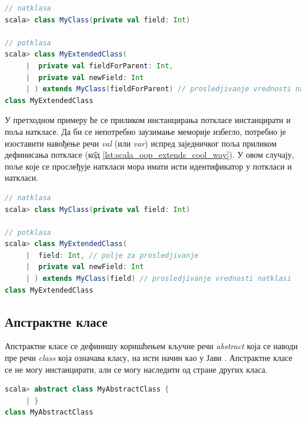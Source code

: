 \documentclass[12pt,oneside]{memoir}
\begin{document}
\begin{lstlisting}[language=Scala, caption={Наслеђивање у Скали}, label={lst:scala_oop_extends_example}, basicstyle=\small]
// natklasa
scala> class MyClass(private val field: Int) 

// potklasa
scala> class MyExtendedClass(
     |  private val fieldForParent: Int,
     |  private val newField: Int
     | ) extends MyClass(fieldForParent) // prosledjivanje vrednosti natklasi
class MyExtendedClass

\end{lstlisting}

У претходном примеру ће се приликом инстанцирања поткласе инстанцирати и поља наткласе. Да би се непотребно заузимање меморије избегло, потребно је изоставити навођење речи \textit{val} (или \textit{var}) испред заједничког поља приликом дефинисања поткласе (к\^{о}д \ref{lst:scala_oop_extends_cool_way}). У овом случају, поље које се прослеђује наткласи мора имати исти идентификатор у поткласи и наткласи.

\begin{lstlisting}[language=Scala, caption={Наслеђивање изастављењем речи \textit{val}}, label={lst:scala_oop_extends_cool_way}, basicstyle=\small]
// natklasa
scala> class MyClass(private val field: Int) 

// potklasa
scala> class MyExtendedClass(
     |  field: Int, // polje za prosledjivanje
     |  private val newField: Int
     | ) extends MyClass(field) // prosledjivanje vrednosti natklasi
class MyExtendedClass

\end{lstlisting}


\subsection{Апстрактне класе}
\label{subsec:scala_abs}

Апстрактне класе се дефинишу коришћењем кључне речи \textit{abstract} која се наводи пре речи \textit{class} која означава класу, на исти начин као у Јави \cite{scala_prog}. Апстрактне класе се не могу инстанцирати, али се могу наследити од стране других класа.

\begin{lstlisting}[language=Scala, caption={Апстрактна класа у Скали}, label={lst:scala_oop_abstract_class_example}, basicstyle=\small]
scala> abstract class MyAbstractClass {
     | }
class MyAbstractClass
\end{lstlisting}
\end{document}
